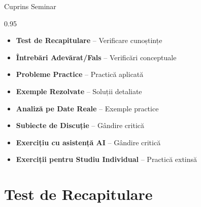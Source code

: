 \documentclass[9pt, aspectratio=169, t]{beamer}
\subtitle{Seminar 6: VAR \& Cauzalitate Granger}
\begin{document}
{
\begin{frame}
    \titlepage
\end{frame}
}

\begin{frame}{Cuprins Seminar}
    \begin{cminipage}{0.95\textwidth}
    \begin{itemize}\setlength{\itemsep}{0pt}
        \item \textbf{Test de Recapitulare} -- Verificare cunoștințe
        \vspace{0.15cm}
        \item \textbf{Întrebări Adevărat/Fals} -- Verificări conceptuale
        \vspace{0.15cm}
        \item \textbf{Probleme Practice} -- Practică aplicată
        \vspace{0.15cm}
        \item \textbf{Exemple Rezolvate} -- Soluții detaliate
        \vspace{0.15cm}
        \item \textbf{Analiză pe Date Reale} -- Exemple practice
        \vspace{0.15cm}
        \item \textbf{Subiecte de Discuție} -- Gândire critică
        \vspace{0.15cm}
        \item \textbf{Exercițiu cu asistență AI} -- Gândire critică
        \vspace{0.15cm}
        \item \textbf{Exerciții pentru Studiu Individual} -- Practică extinsă
    \end{itemize}
    \end{cminipage}
\end{frame}


\section{Test de Recapitulare}
\end{document}

